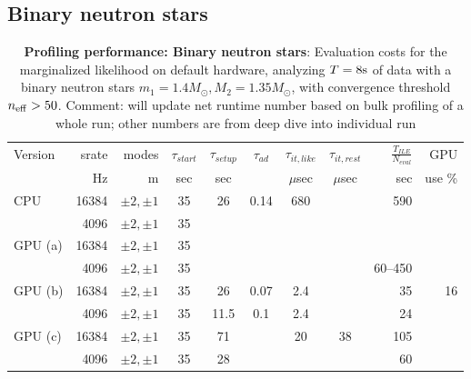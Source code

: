 \documentclass[twocolumn,prd,nofootinbib]{revtex4}
\newcommand\unit[1]{{\rm #1}}
\newcommand\editremark[1]{{\color{red} #1}}
\begin{document}
\subsection{Binary neutron stars}
\begin{table}
\begin{tabular}{lrr|ccccc|rr}
Version & srate & modes & $\tau_{start}$ & $\tau_{setup}$ & $\tau_{ad}$ & $\tau_{it,like}$ &$\tau_{it,rest}$ &
$\frac{T_{ILE}}{N_{eval}}$ & GPU \\  %
  &   Hz & m & sec & sec & & $\mu$sec & $\mu$sec  &sec  & use  \%\\ \hline 
CPU & 16384 & $\pm 2,\pm 1 $ & 35 & 26 & 0.14  & 680  & & 590    \\ 
       & 4096 & $\pm 2, \pm 1$ & 35 & &  &   &&  &  \\ \hline
GPU (a) & 16384 & $\pm 2, \pm 1$   & 35 &  &&&  &   \\
       & 4096 & $ \pm 2, \pm 1 $        &  35  & &&&& 60--450  \\ \hline
GPU (b) & 16384 & $\pm 2, \pm 1$   & 35 & 26 & 0.07 &  2.4 & &35 & 16 \\
       & 4096 & $ \pm 2, \pm 1 $        &  35  & 11.5 & 0.1 &  2.4  & &24 &  \\ \hline
GPU (c) & 16384 & $\pm 2, \pm 1$   & 35 & 71 &&20 & \editremark{38} &  105   \\
       & 4096 & $ \pm 2, \pm 1 $        &  35  & 28 && && 60  \\ \hline
\end{tabular}
\caption{\label{tab:CostBreakdown:BNS}\textbf{Profiling performance: Binary neutron stars}: Evaluation costs for the
  marginalized likelihood on default
  hardware,  analyzing $T=8\unit{s}$ of data with a binary neutron stars
  $m_1=1.4 M_\odot,M_2=1.35 M_\odot$, with convergence threshold $n_{\rm eff} > 50$.
\editremark{Comment: will update net runtime number based on bulk profiling of a whole run; other numbers are from deep dive into individual run}
}
\end{table}
\end{document}
